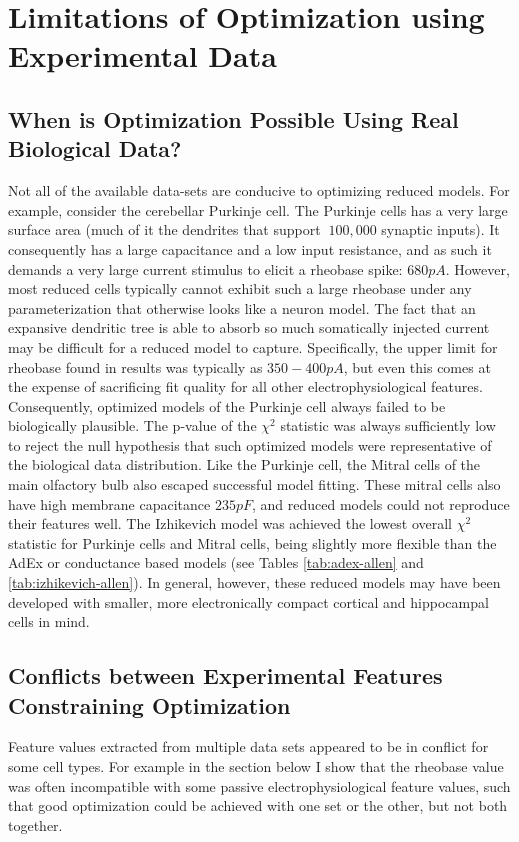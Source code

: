 
\section{Limitations of Optimization using Experimental Data}
\label{sec:limitations-of-optimization}

\subsection{When is Optimization Possible Using Real Biological Data?}
Not all of the available data-sets are conducive to optimizing reduced models.
For example, consider the cerebellar Purkinje cell.
The Purkinje cells has a very large surface area (much of it the dendrites that support $~100,000$ synaptic inputs).
It consequently has a large capacitance and a low input resistance, and as such it demands a very large current stimulus to elicit a rheobase spike: $680pA$.
However, most reduced cells typically cannot exhibit such a large rheobase under any parameterization that otherwise looks like a neuron model.
The fact that an expansive dendritic tree is able to absorb so much somatically injected current may be difficult for a reduced model to capture.
Specifically, the upper limit for rheobase found in results was typically as $350-400pA$, but even this comes at the expense of sacrificing fit quality for all other electrophysiological features.
Consequently, optimized models of the Purkinje cell always failed to be biologically plausible.
The p-value of the $\chi^{2}$ statistic was always sufficiently low to reject the null hypothesis that such optimized models were representative of the biological data distribution.
Like the Purkinje cell, the Mitral cells of the main olfactory bulb also escaped successful model fitting.
These mitral cells also have high membrane capacitance $235pF$, and reduced models could not reproduce their features well.  
The Izhikevich model was achieved the lowest overall $\chi^{2}$ statistic for Purkinje cells and Mitral cells, being slightly more flexible than the AdEx or  conductance based models (see Tables \ref{tab:adex-allen} and \ref{tab:izhikevich-allen}).
In general, however, these reduced models may have been developed with smaller, more electronically compact cortical and hippocampal cells in mind.

\subsection{Conflicts between Experimental Features Constraining Optimization}
Feature values extracted from multiple data sets appeared to be in conflict for some cell types.
For example in the section below I show that the rheobase value was often incompatible with some passive electrophysiological feature values, such that good optimization could be achieved with one set or the other, but not both together.

